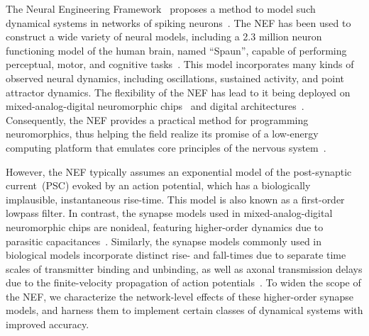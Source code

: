 
The Neural Engineering Framework~\citep[NEF;][]{eliasmith1999developing, eliasmith2003a} proposes a method to model such dynamical systems in networks of spiking neurons~\citep[see][for reviews of other methods]{abbott2016building, deneve2016efficient}.
The NEF has been used to construct a wide variety of neural models, including a 2.3 million neuron functioning model of the human brain, named ``Spaun'', capable of performing perceptual, motor, and cognitive tasks~\citep{eliasmith2012}.
This model incorporates many kinds of observed neural dynamics, including oscillations, sustained activity, and point attractor dynamics.
The flexibility of the NEF has lead to it being deployed on mixed-analog-digital neuromorphic chips~\citep{choudhary2012silicon, corradi2014, voelker2017iscas, voelker2017neuromorphic} and digital architectures~\citep{bekolay2013, wang2014compact, mundy2015efficient, berzish2016}.
Consequently, the NEF provides a practical method for programming neuromorphics, thus helping the field realize its promise of a low-energy computing platform that emulates core principles of the nervous system~\citep{boahen2017neuromorph}.

However, the NEF typically assumes an exponential model of the post-synaptic current~(PSC) evoked by an action potential, which has a biologically implausible, instantaneous rise-time.
This model is also known as a first-order lowpass filter.
In contrast, the synapse models used in mixed-analog-digital neuromorphic chips are nonideal, featuring higher-order dynamics due to parasitic capacitances~\citep{voelker2017iscas}.
Similarly, the synapse models commonly used in biological models incorporate distinct rise- and fall-times due to separate time scales of transmitter binding and unbinding, as well as axonal transmission delays due to the finite-velocity propagation of action potentials~\citep{roth2009modeling}.
To widen the scope of the NEF, we characterize the network-level effects of these higher-order synapse models, and harness them to implement certain classes of dynamical systems with improved accuracy.

